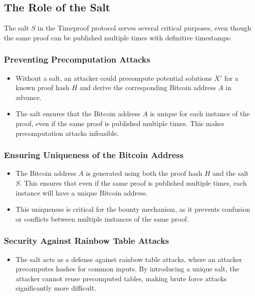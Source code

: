 \documentclass[12pt]{report}
\begin{document}
\subsection{The Role of the Salt}

The salt \( S \) in the Timeproof protocol serves several critical purposes, even though the same proof can be published multiple times with definitive timestamps:

\subsubsection{Preventing Precomputation Attacks}
\begin{itemize}
    \item Without a salt, an attacker could precompute potential solutions \( X' \) for a known proof hash \( H \) and derive the corresponding Bitcoin address \( A \) in advance.
    \item The salt ensures that the Bitcoin address \( A \) is unique for each instance of the proof, even if the same proof is published multiple times. This makes precomputation attacks infeasible.
\end{itemize}

\subsubsection{Ensuring Uniqueness of the Bitcoin Address}
\begin{itemize}
    \item The Bitcoin address \( A \) is generated using both the proof hash \( H \) and the salt \( S \). This ensures that even if the same proof is published multiple times, each instance will have a unique Bitcoin address.
    \item This uniqueness is critical for the bounty mechanism, as it prevents confusion or conflicts between multiple instances of the same proof.
\end{itemize}

\subsubsection{Security Against Rainbow Table Attacks}
\begin{itemize}
    \item The salt acts as a defense against rainbow table attacks, where an attacker precomputes hashes for common inputs. By introducing a unique salt, the attacker cannot reuse precomputed tables, making brute force attacks significantly more difficult.
\end{itemize}
\end{document}
